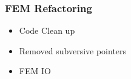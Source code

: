 
\begin{frame}
\frametitle{FEM Refactoring}
\Huge
\begin{itemize}
\item Code Clean up
\pause
\item Removed subversive pointers
\pause
\item FEM IO
\end{itemize}
\end{frame}

